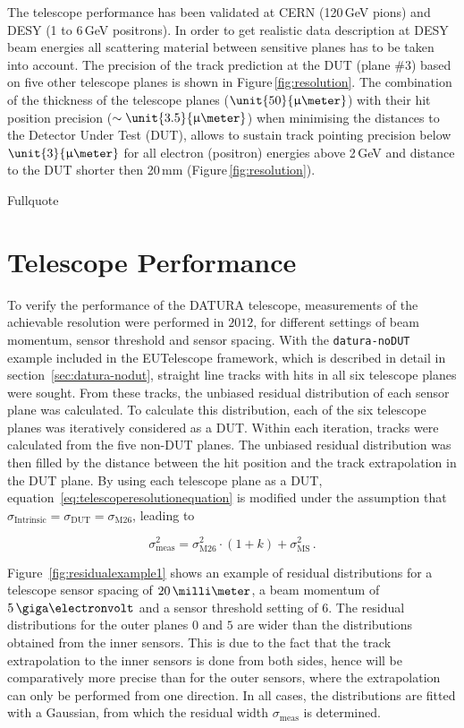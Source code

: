 
The telescope performance has been validated at CERN (120\,GeV pions) and DESY (1 to 6\,GeV positrons). 
In order to get realistic data description at DESY beam energies all scattering material between sensitive planes has to be taken into account. 
The precision of the track prediction at the DUT (plane \#3) based on five other telescope planes is shown in Figure\,\ref{fig:resolution}. 
The combination of the thickness of the telescope planes ($\unit{50}{\upmu\meter}$) with their hit position precision ($\sim\unit{3.5}{\upmu\meter}$)
 when minimising the distances to the Detector Under Test (DUT), 
 allows to sustain track pointing precision below $\unit{3}{\upmu\meter}$ for all electron (positron) energies above 2\,GeV and distance to the DUT shorter then 20\,mm (Figure\,\ref{fig:resolution}).


Fullquote~\cite{ref:thomas}
\bigskip


\section{Telescope Performance}\label{sec:telescoperesolution}

To verify the performance of the {DATURA} telescope, measurements of the
achievable resolution were performed in $2012$, for different settings of beam
momentum, sensor threshold and sensor spacing. With the \texttt{datura-noDUT}
example included in the {EUTelescope} framework, which is described in detail in
section~\ref{sec:datura-nodut}, straight line tracks with hits in all six
telescope planes were sought. From these tracks, the unbiased residual
distribution of each sensor plane was calculated. To calculate this
distribution, each of the six telescope planes was iteratively considered as a
DUT. Within each iteration, tracks were calculated from the five non-DUT planes.
The unbiased residual distribution was then filled by the distance between the
hit position and the track extrapolation in the DUT plane. By using each
telescope plane as a DUT, equation~\ref{eq:telescoperesolutionequation} is
modified under the assumption that $\sigma_{\textrm{Intrinsic}} =
\sigma_{\textrm{DUT}} = \sigma_{\textrm{M26}}$, leading to

\begin{equation}
\label{eq:telescoperesolutionequation_2}
\sigma_{\textrm{meas}}^2 = \sigma_{\textrm{M26}}^2 \cdot \left( 1 + k \right) +
\sigma_{\textrm{MS}}^2\,.
\end{equation}


Figure~\ref{fig:residualexample1} shows an example of residual distributions for
a telescope sensor spacing of $20\,\milli\meter$, a beam momentum of
$5\,\giga\electronvolt$ and a sensor threshold setting of $6$. The residual
distributions for the outer planes $0$ and $5$ are wider than the distributions
obtained from the inner sensors. This is due to the fact that the track
extrapolation to the inner sensors is done from both sides, hence will be
comparatively more precise than for the outer sensors, where the extrapolation
can only be performed from one direction. In all cases, the distributions are
fitted with a Gaussian, from which the residual width $\sigma_{\textrm{meas}}$
is determined.\\

